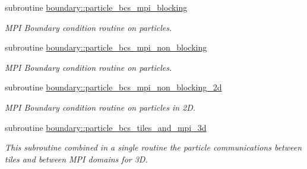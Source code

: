 \begin{DoxyCompactItemize}
subroutine \hyperlink{namespaceboundary_a1789d63402ac897697791a2fca4fa8e6}{boundary\+::particle\+\_\+bcs\+\_\+mpi\+\_\+blocking}
\begin{DoxyCompactList}\small\item\em M\+PI Boundary condition routine on particles. \end{DoxyCompactList}\item 
subroutine \hyperlink{namespaceboundary_aac32f7f65f1998963706f9d5776d29d2}{boundary\+::particle\+\_\+bcs\+\_\+mpi\+\_\+non\+\_\+blocking}
\begin{DoxyCompactList}\small\item\em M\+PI Boundary condition routine on particles. \end{DoxyCompactList}\item 
subroutine \hyperlink{namespaceboundary_a3293856926030dfea9e8ca05c61e1a5a}{boundary\+::particle\+\_\+bcs\+\_\+mpi\+\_\+non\+\_\+blocking\+\_\+2d}
\begin{DoxyCompactList}\small\item\em M\+PI Boundary condition routine on particles in 2D. \end{DoxyCompactList}\item 
subroutine \hyperlink{namespaceboundary_ac117306978e83b787afba90c3ac038f4}{boundary\+::particle\+\_\+bcs\+\_\+tiles\+\_\+and\+\_\+mpi\+\_\+3d}
\begin{DoxyCompactList}\small\item\em This subroutine combined in a single routine the particle communications between tiles and between M\+PI domains for 3D. \end{DoxyCompactList}\end{DoxyCompactItemize}
